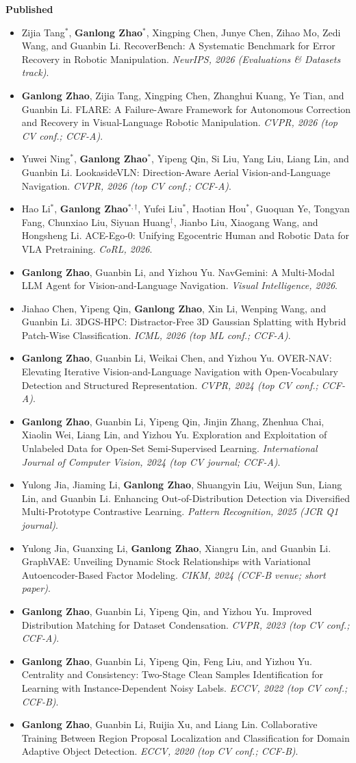 \documentclass[a4paper,9pt]{extarticle}
\newcommand{\me}{\textbf{Ganlong Zhao}}
\newcommand{\pubentry}[3]{%
    \item #1. #2. \textit{#3}.%
}
\begin{document}
\noindent
\textbf{Published}
\begin{itemize}[leftmargin=*, itemsep=1mm]
    \pubentry{Zijia Tang$^*$, \me$^*$, Xingping Chen, Junye Chen, Zihao Mo, Zedi Wang, and Guanbin Li}
        {RecoverBench: A Systematic Benchmark for Error Recovery in Robotic Manipulation}
        {NeurIPS, 2026 (Evaluations \& Datasets track)}
    \pubentry{\me, Zijia Tang, Xingping Chen, Zhanghui Kuang, Ye Tian, and Guanbin Li}
        {FLARE: A Failure-Aware Framework for Autonomous Correction and Recovery in Visual-Language Robotic Manipulation}
        {CVPR, 2026 (top CV conf.; CCF-A)}
    \pubentry{Yuwei Ning$^*$, \me$^*$, Yipeng Qin, Si Liu, Yang Liu, Liang Lin, and Guanbin Li}
        {LookasideVLN: Direction-Aware Aerial Vision-and-Language Navigation}
        {CVPR, 2026 (top CV conf.; CCF-A)}
    \pubentry{Hao Li$^*$, \me$^{*,\dagger}$, Yufei Liu$^*$, Haotian Hou$^*$, Guoquan Ye, Tongyan Fang, Chunxiao Liu, Siyuan Huang$^\dagger$, Jianbo Liu, Xiaogang Wang, and Hongsheng Li}
        {ACE-Ego-0: Unifying Egocentric Human and Robotic Data for VLA Pretraining}
        {CoRL, 2026}
    \pubentry{\me, Guanbin Li, and Yizhou Yu}
        {NavGemini: A Multi-Modal LLM Agent for Vision-and-Language Navigation}
        {Visual Intelligence, 2026}
    \pubentry{Jiahao Chen, Yipeng Qin, \me, Xin Li, Wenping Wang, and Guanbin Li}
        {3DGS-HPC: Distractor-Free 3D Gaussian Splatting with Hybrid Patch-Wise Classification}
        {ICML, 2026 (top ML conf.; CCF-A)}
    \pubentry{\me, Guanbin Li, Weikai Chen, and Yizhou Yu}
        {OVER-NAV: Elevating Iterative Vision-and-Language Navigation with Open-Vocabulary Detection and Structured Representation}
        {CVPR, 2024 (top CV conf.; CCF-A)}
    \pubentry{\me, Guanbin Li, Yipeng Qin, Jinjin Zhang, Zhenhua Chai, Xiaolin Wei, Liang Lin, and Yizhou Yu}
        {Exploration and Exploitation of Unlabeled Data for Open-Set Semi-Supervised Learning}
        {International Journal of Computer Vision, 2024 (top CV journal; CCF-A)}
    \pubentry{Yulong Jia, Jiaming Li, \me, Shuangyin Liu, Weijun Sun, Liang Lin, and Guanbin Li}
        {Enhancing Out-of-Distribution Detection via Diversified Multi-Prototype Contrastive Learning}
        {Pattern Recognition, 2025 (JCR Q1 journal)}
    \pubentry{Yulong Jia, Guanxing Li, \me, Xiangru Lin, and Guanbin Li}
        {GraphVAE: Unveiling Dynamic Stock Relationships with Variational Autoencoder-Based Factor Modeling}
        {CIKM, 2024 (CCF-B venue; short paper)}
    \pubentry{\me, Guanbin Li, Yipeng Qin, and Yizhou Yu}
        {Improved Distribution Matching for Dataset Condensation}
        {CVPR, 2023 (top CV conf.; CCF-A)}
    \pubentry{\me, Guanbin Li, Yipeng Qin, Feng Liu, and Yizhou Yu}
        {Centrality and Consistency: Two-Stage Clean Samples Identification for Learning with Instance-Dependent Noisy Labels}
        {ECCV, 2022 (top CV conf.; CCF-B)}
    \pubentry{\me, Guanbin Li, Ruijia Xu, and Liang Lin}
        {Collaborative Training Between Region Proposal Localization and Classification for Domain Adaptive Object Detection}
        {ECCV, 2020 (top CV conf.; CCF-B)}
\end{itemize}
\end{document}
